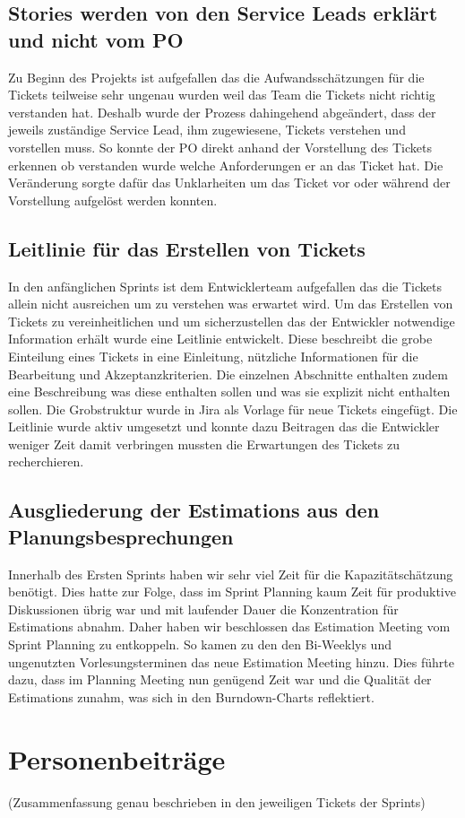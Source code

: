 \subsection{Stories werden von den Service Leads erklärt und nicht vom PO}
Zu Beginn des Projekts ist aufgefallen das die Aufwandsschätzungen für die Tickets 
teilweise sehr ungenau wurden weil das Team die Tickets nicht richtig verstanden hat. 
Deshalb wurde der Prozess dahingehend abgeändert, dass der jeweils zuständige Service 
Lead, ihm zugewiesene, Tickets verstehen und vorstellen muss. So konnte der PO direkt 
anhand der Vorstellung des Tickets erkennen ob verstanden wurde welche Anforderungen 
er an das Ticket hat. Die Veränderung sorgte dafür das Unklarheiten um das Ticket vor
oder während der Vorstellung aufgelöst werden konnten. 

\subsection{Leitlinie für das Erstellen von Tickets}
In den anfänglichen Sprints ist dem Entwicklerteam aufgefallen das die Tickets allein nicht ausreichen 
um zu verstehen was erwartet wird. Um das Erstellen von Tickets zu vereinheitlichen und um sicherzustellen 
das der Entwickler notwendige Information erhält wurde eine Leitlinie entwickelt. 
Diese beschreibt die grobe Einteilung eines Tickets in eine Einleitung, nützliche Informationen für die 
Bearbeitung und Akzeptanzkriterien. Die einzelnen Abschnitte enthalten zudem eine Beschreibung was diese 
enthalten sollen und was sie explizit nicht enthalten sollen. Die Grobstruktur wurde in Jira als Vorlage 
für neue Tickets eingefügt.
Die Leitlinie wurde aktiv umgesetzt und konnte dazu Beitragen das die Entwickler weniger Zeit damit 
verbringen mussten die Erwartungen des Tickets zu recherchieren. 

\subsection{Ausgliederung der Estimations aus den Planungsbesprechungen}

Innerhalb des Ersten Sprints haben wir sehr viel Zeit für die Kapazitätschätzung benötigt. 
Dies hatte zur Folge, dass im Sprint Planning kaum Zeit für produktive Diskussionen übrig war und mit laufender Dauer die Konzentration für Estimations abnahm.
Daher haben wir beschlossen das Estimation Meeting vom Sprint Planning zu entkoppeln.
So kamen zu den den Bi-Weeklys und ungenutzten Vorlesungsterminen das neue Estimation Meeting hinzu.
Dies führte dazu, dass im Planning Meeting nun genügend Zeit war und die Qualität der Estimations zunahm, was sich in den Burndown-Charts reflektiert.

\section{Personenbeiträge}
(Zusammenfassung genau beschrieben in den jeweiligen Tickets der Sprints)